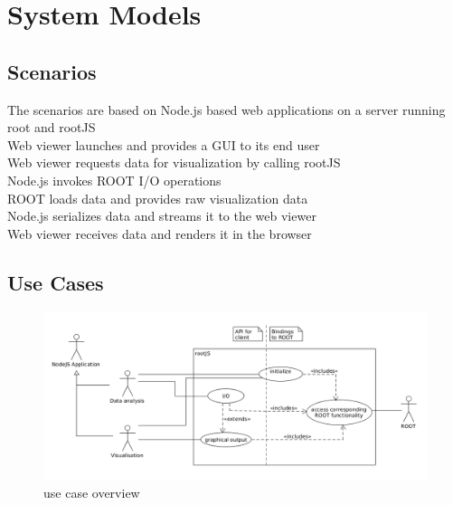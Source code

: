 \chapter{System Models}

\section{Scenarios}
The scenarios are based on Node.js based web applications on a server running root and rootJS\\

Web viewer launches and provides a GUI to its end user	\\
Web viewer requests data for visualization by calling rootJS\\
\indent	Node.js invokes ROOT I/O operations\\
\indent \indent		ROOT loads data and provides raw visualization data\\
\indent	Node.js serializes data and streams it to the web viewer\\
Web viewer receives data and renders it in the browser\\
\section{Use Cases}
\begin{figure}[htb]
	\centering
	\includegraphics[width=18cm]{./latex/resources/usecaseOverview.png}
	\caption{use case overview}
\end{figure}


\pagebreak[4]

